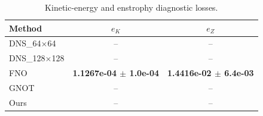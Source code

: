 \begin{table}[t]
\centering
\caption{Kinetic-energy and enstrophy diagnostic losses.}
\label{tab:ke_enstrophy_losses}
\begin{tabular}{lcc}
\toprule
Method & $e_K$ & $e_Z$ \\
\midrule
DNS\_64$\times$64 & -- & -- \\
DNS\_128$\times$128 & -- & -- \\
FNO & \textbf{1.1267e-04 $\pm$ 1.0e-04} & \textbf{1.4416e-02 $\pm$ 6.4e-03} \\
GNOT & -- & -- \\
Ours & -- & -- \\
\bottomrule
\end{tabular}
\end{table}